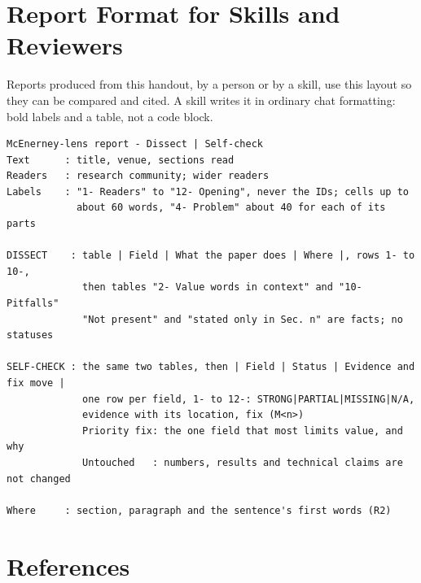 \documentclass[11pt]{article}
\newif\ifmarkadded \markaddedtrue   %
\newcommand{\added}{\ifmarkadded\,{\setlength{\fboxsep}{1.2pt}\fcolorbox{rulec}{white}{\sffamily\tiny\bfseries\color{accent}ADDED}}\fi}
\begin{document}
\section{\texorpdfstring{Report Format for Skills and Reviewers\added}{Report Format for Skills and Reviewers}}

Reports produced from this handout, by a person or by a skill, use this layout so they can be compared and
cited. A skill writes it in ordinary chat formatting: bold labels and a table, not a code block.

\begin{panel}[breakable=false]
\small
\begin{verbatim}
McEnerney-lens report - Dissect | Self-check
Text      : title, venue, sections read
Readers   : research community; wider readers
Labels    : "1- Readers" to "12- Opening", never the IDs; cells up to
            about 60 words, "4- Problem" about 40 for each of its parts

DISSECT    : table | Field | What the paper does | Where |, rows 1- to 10-,
             then tables "2- Value words in context" and "10- Pitfalls"
             "Not present" and "stated only in Sec. n" are facts; no statuses

SELF-CHECK : the same two tables, then | Field | Status | Evidence and fix move |
             one row per field, 1- to 12-: STRONG|PARTIAL|MISSING|N/A,
             evidence with its location, fix (M<n>)
             Priority fix: the one field that most limits value, and why
             Untouched   : numbers, results and technical claims are not changed

Where     : section, paragraph and the sentence's first words (R2)
\end{verbatim}
\end{panel}

\section{References}
\enlargethispage{1\baselineskip}%
\end{document}
